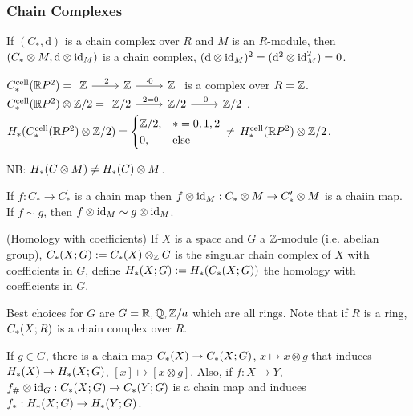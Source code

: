 \documentclass[a4paper,11pt]{article}
\begin{document}
			\subsubsection*{Chain Complexes}
				If $(C_\ast,\mathrm{d})$ is a chain complex over $R$ and $M$ is an $R$-module, then $(C_\ast\otimes M,\mathrm{d}\otimes\operatorname{id}_M)$ is a chain complex, $(\mathrm{d}\otimes\operatorname{id}_M)^2=(\mathrm{d}^2\otimes\operatorname{id}^2_M)=0$.

				\begin{eg}
					$C_\ast^\text{cell}(\R P^2)=\begin{tikzcd}
						\Z\ar[r,"\cdot 2"]& \Z\ar[r,"\cdot 0"]& \Z
					\end{tikzcd}$ is a complex over $R=\mathbb{Z}$.\\
					$C_\ast^\text{cell}(\R P^2)\otimes\Z/2=\begin{tikzcd}
						\Z/2\ar[r,"\cdot 2=0"]& \Z/2\ar[r,"\cdot 0"]& \Z/2
					\end{tikzcd}$.\\
					$H_{\ast}(C_\ast^\text{cell}(\mathbb{R} P^2)\otimes\mathbb{Z}/2)=\begin{cases}
						\mathbb{Z}/2,&\ast=0,1,2\\0,&\text{else}
					\end{cases}\,\neq\, H_\ast^\text{cell}(\mathbb{R} P^2)\otimes\mathbb{Z}/2$.
				\end{eg}

				\noindent NB: $H_{\ast}(C\otimes M)\neq H_{\ast}(C)\otimes M$.

				\begin{lemma}
					If $f:C_\ast\rightarrow C_\ast^{\prime}$ is a chain map then $f\otimes\operatorname{id}_M:C_\ast\otimes M\rightarrow C_\ast^{\prime}\otimes M$ is a chaiin map. If $f\sim g$, then $f\otimes\operatorname{id}_M\sim g\otimes\operatorname{id}_M$.
				\end{lemma}

				\begin{defi}(Homology with coefficients)
					If $X$ is a space and $G$ a $\mathbb{Z}$-module (i.e. abelian group), $C_\ast(X;G):=C_\ast(X)\otimes_{\mathbb{Z}} G$ is the singular chain complex of $X$ with coefficients in $G$, define $H_{\ast}(X;G):=H_{\ast}(C_{\ast}(X;G))$ the homology with coefficients in $G$.
				\end{defi}

				Best choices for $G$ are $G=\mathbb{R},\mathbb{Q},\mathbb{Z}/a$ which are all rings. Note that if $R$ is a ring, $C_{\ast}(X;R)$ is a chain complex over $R$.

				 If $g\in G$, there is a chain map $C_{\ast}(X)\rightarrow C_{\ast}(X;G)$, $x\mapsto x\otimes g$ that induces $H_{\ast}(X)\rightarrow H_{\ast}(X;G)$, $[x]\mapsto[x\otimes g]$. Also, if $f:X\rightarrow Y$, $f_\#\otimes\operatorname{id}_G:C_{\ast}(X;G)\rightarrow C_{\ast}(Y;G)$ is a chain map and induces $f_\ast:H_{\ast}(X;G)\rightarrow H_{\ast}(Y;G)$.
\end{document}
